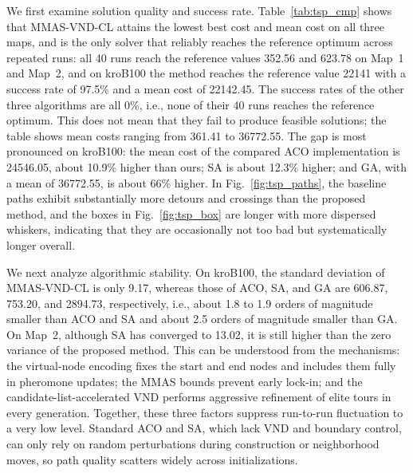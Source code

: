 We first examine solution quality and success rate. Table~\textcolor{blue}{\ref{tab:tsp_cmp}} shows that MMAS-VND-CL attains the lowest best cost and mean cost on all three maps, and is the only solver that reliably reaches the reference optimum across repeated runs: all 40 runs reach the reference values 352.56 and 623.78 on Map~1 and Map~2, and on kroB100 the method reaches the reference value 22141 with a success rate of 97.5\% and a mean cost of 22142.45. The success rates of the other three algorithms are all 0\%, i.e., none of their 40 runs reaches the reference optimum. This does not mean that they fail to produce feasible solutions; the table shows mean costs ranging from 361.41 to 36772.55. The gap is most pronounced on kroB100: the mean cost of the compared ACO implementation is 24546.05, about 10.9\% higher than ours; SA is about 12.3\% higher; and GA, with a mean of 36772.55, is about 66\% higher. In Fig.~\textcolor{blue}{\ref{fig:tsp_paths}}, the baseline paths exhibit substantially more detours and crossings than the proposed method, and the boxes in Fig.~\textcolor{blue}{\ref{fig:tsp_box}} are longer with more dispersed whiskers, indicating that they are occasionally not too bad but systematically longer overall.

We next analyze algorithmic stability. On kroB100, the standard deviation of MMAS-VND-CL is only 9.17, whereas those of ACO, SA, and GA are 606.87, 753.20, and 2894.73, respectively, i.e., about 1.8 to 1.9 orders of magnitude smaller than ACO and SA and about 2.5 orders of magnitude smaller than GA. On Map~2, although SA has converged to 13.02, it is still higher than the zero variance of the proposed method. This can be understood from the mechanisms: the virtual-node encoding fixes the start and end nodes and includes them fully in pheromone updates; the MMAS bounds prevent early lock-in; and the candidate-list-accelerated VND performs aggressive refinement of elite tours in every generation. Together, these three factors suppress run-to-run fluctuation to a very low level. Standard ACO and SA, which lack VND and boundary control, can only rely on random perturbations during construction or neighborhood moves, so path quality scatters widely across initializations.

